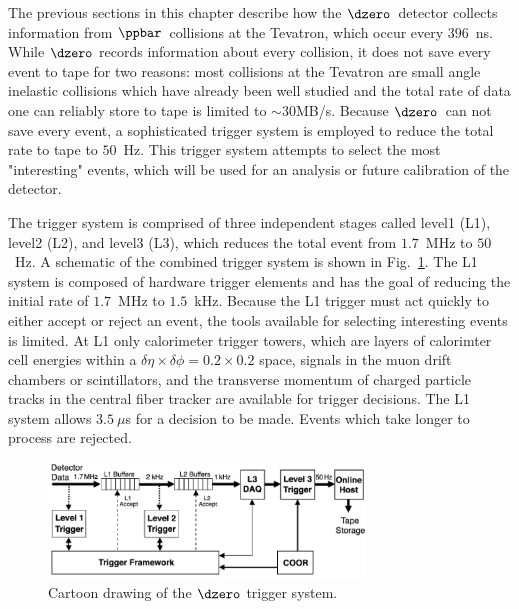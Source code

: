 The previous sections in this chapter describe how the $\dzero$~detector collects information from $\ppbar$~collisions at the Tevatron, which occur every $396$~ns. While $\dzero$ records information about every collision, it does not save every event to tape for two reasons: most collisions at the Tevatron are small angle inelastic collisions which have already been well studied and the total rate of data one can reliably store to tape is limited to $\sim$30MB/s. Because $\dzero$~can not save every event, a sophisticated trigger system is employed to reduce the total rate to tape to $50$~Hz. This trigger system attempts to select the most "interesting" events, which will be used for an analysis or future calibration of the detector.

The trigger system is comprised of three independent stages called level1 (L1), level2 (L2), and level3 (L3), which reduces the total event from $1.7$~MHz to $50$~Hz. A schematic of the combined trigger system is shown in Fig.~\ref{Trigger}. The L1 system is composed of hardware trigger elements and has the goal of reducing the initial rate of  $1.7$~MHz to $1.5$~kHz. Because the L1 trigger must act quickly to either accept or reject an event, the tools available for selecting interesting events is limited. At L1 only calorimeter trigger towers, which are layers of calorimter cell energies within a $\delta\eta \times \delta\phi = 0.2 \times 0.2$ space, signals in the muon drift chambers or scintillators, and the transverse momentum of charged particle tracks in the central fiber tracker are available for trigger decisions. The L1 system allows $3.5~\mu$s for a decision to be made. Events which take longer to process are rejected.

\begin{figure}[!h!tbp]
\begin{center}
\includegraphics[width=0.75\textwidth]{eps/D0/TriggerFlow2.eps}
\end{center}
\vspace{-0.1in}
\caption{Cartoon drawing of the $\dzero$ trigger system.}
\label{Trigger}
\end{figure}

